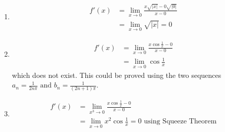 \begin{numedquestion}
    \begin{enumerate}[label = {(\arabic*)}]
    \item  
    \begin{align*}
      f'(x) &= \lim_{x \rightarrow 0} \frac{x\sqrt{|x|} - 0\sqrt{|0|}}{x - 0} \\
      &= \lim_{x \rightarrow 0}\sqrt{|x|} = 0
    \end{align*}
    \item \begin{align*}
      f'(x) &= \lim_ {x \rightarrow 0} \frac{x\cos \frac{1}{x} - 0}{x - 0} \\
      &= \lim_ {x \rightarrow 0} \cos \frac{1}{x}
    \end{align*}
    which does not exist. This could be proved using the two sequences $a_{n}=\frac{1}{2 n \pi} \text { and } b_{n}=\frac{1}{(2 n+1) \pi}$.
    \item \begin{align*}
      f'(x) &= \lim_ {x^3 \rightarrow 0} \frac{x\cos \frac{1}{x} - 0}{x - 0} \\
      &= \lim_ {x \rightarrow 0} x^2 \cos \frac{1}{x} = 0 \text { using Squeeze Theorem}
    \end{align*}
   
  \end{enumerate}
\end{numedquestion}
  
